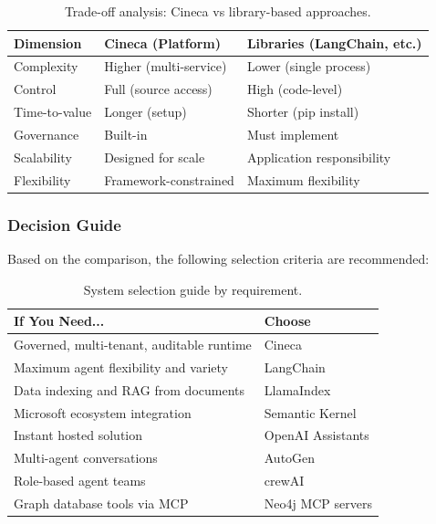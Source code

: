 \begin{table}[ht]
\centering
\caption{Trade-off analysis: Cineca vs library-based approaches.}
\label{tab:tradeoffs}
\small
\begin{tabular}{lll}
\hline
\textbf{Dimension} & \textbf{Cineca (Platform)} & \textbf{Libraries (LangChain, etc.)} \\
\hline
Complexity & Higher (multi-service) & Lower (single process) \\
Control & Full (source access) & High (code-level) \\
Time-to-value & Longer (setup) & Shorter (pip install) \\
Governance & Built-in & Must implement \\
Scalability & Designed for scale & Application responsibility \\
Flexibility & Framework-constrained & Maximum flexibility \\
\hline
\end{tabular}
\end{table}

\subsubsection{Decision Guide}

Based on the comparison, the following selection criteria are recommended:

\begin{table}[ht]
\centering
\caption{System selection guide by requirement.}
\label{tab:selection-guide}
\small
\begin{tabular}{p{6cm}l}
\hline
\textbf{If You Need...} & \textbf{Choose} \\
\hline
Governed, multi-tenant, auditable runtime & Cineca \\
Maximum agent flexibility and variety & LangChain \\
Data indexing and RAG from documents & LlamaIndex \\
Microsoft ecosystem integration & Semantic Kernel \\
Instant hosted solution & OpenAI Assistants \\
Multi-agent conversations & AutoGen \\
Role-based agent teams & crewAI \\
Graph database tools via MCP & Neo4j MCP servers \\
\hline
\end{tabular}
\end{table}

